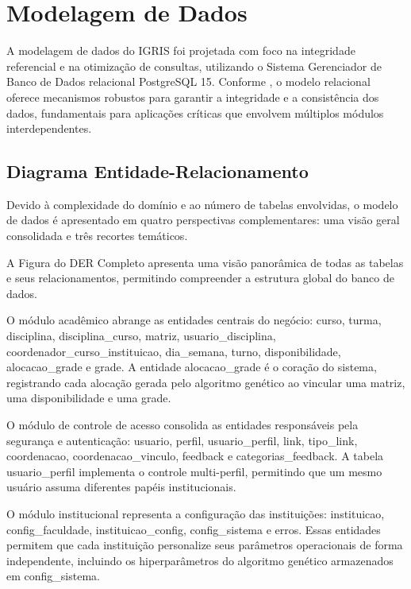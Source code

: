 \section{Modelagem de Dados}
\label{sec:4.4}

A modelagem de dados do IGRIS foi projetada com foco na integridade referencial e na otimização de consultas, utilizando o Sistema Gerenciador de Banco de Dados relacional PostgreSQL 15. Conforme , o modelo relacional oferece mecanismos robustos para garantir a integridade e a consistência dos dados, fundamentais para aplicações críticas que envolvem múltiplos módulos interdependentes.

\subsection{Diagrama Entidade-Relacionamento}
\label{subsec:4.4.1}

Devido à complexidade do domínio e ao número de tabelas envolvidas, o modelo de dados é apresentado em quatro perspectivas complementares: uma visão geral consolidada e três recortes temáticos.

A Figura do DER Completo apresenta uma visão panorâmica de todas as tabelas e seus relacionamentos, permitindo compreender a estrutura global do banco de dados.

O módulo acadêmico abrange as entidades centrais do negócio: curso, turma, disciplina, disciplina\_curso, matriz, usuario\_disciplina, coordenador\_curso\_instituicao, dia\_semana, turno, disponibilidade, alocacao\_grade e grade. A entidade alocacao\_grade é o coração do sistema, registrando cada alocação gerada pelo algoritmo genético ao vincular uma matriz, uma disponibilidade e uma grade.

O módulo de controle de acesso consolida as entidades responsáveis pela segurança e autenticação: usuario, perfil, usuario\_perfil, link, tipo\_link, coordenacao, coordenacao\_vinculo, feedback e categorias\_feedback. A tabela usuario\_perfil implementa o controle multi-perfil, permitindo que um mesmo usuário assuma diferentes papéis institucionais.

O módulo institucional representa a configuração das instituições: instituicao, config\_faculdade, instituicao\_config, config\_sistema e erros. Essas entidades permitem que cada instituição personalize seus parâmetros operacionais de forma independente, incluindo os hiperparâmetros do algoritmo genético armazenados em config\_sistema.

